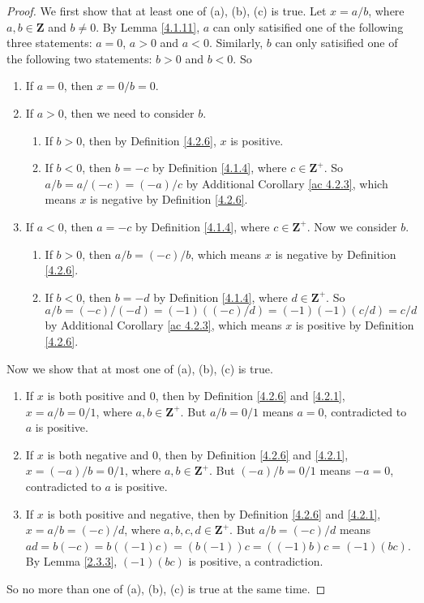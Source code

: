 \begin{proof}
We first show that at least one of (a), (b), (c) is true.
Let \(x = a / b\), where \(a, b \in \mathbf{Z}\) and \(b \neq 0\).
By Lemma \ref{4.1.11}, \(a\) can only satisified one of the following three statements:
\(a = 0\), \(a > 0\) and \(a < 0\).
Similarly, \(b\) can only satisified one of the following two statements:
\(b > 0\) and \(b < 0\).
So
\begin{enumerate}[label=(\Roman*)]
    \item If \(a = 0\), then \(x = 0 / b = 0\).
    \item If \(a > 0\), then we need to consider \(b\).
    \begin{enumerate}[label=(\roman*)]
        \item If \(b > 0\), then by Definition \ref{4.2.6}, \(x\) is positive.
        \item If \(b < 0\), then \(b = -c\) by Definition \ref{4.1.4}, where \(c \in \mathbf{Z}^+\).
        So \(a / b = a / (-c) = (-a) / c\) by Additional Corollary \ref{ac 4.2.3}, which means \(x\) is negative by Definition \ref{4.2.6}.
    \end{enumerate}
    \item If \(a < 0\), then \(a = -c\) by Definition \ref{4.1.4}, where \(c \in \mathbf{Z}^+\).
    Now we consider \(b\).
    \begin{enumerate}[label=(\roman*)]
        \item If \(b > 0\), then \(a / b = (-c) / b\), which means \(x\) is negative by Definition \ref{4.2.6}.
        \item If \(b < 0\), then \(b = -d\) by Definition \ref{4.1.4}, where \(d \in \mathbf{Z}^+\).
        So \(a / b = (-c) / (-d) = (-1)((-c) / d) = (-1)(-1)(c / d) = c / d\) by Additional Corollary \ref{ac 4.2.3}, which means \(x\) is positive by Definition \ref{4.2.6}.
    \end{enumerate}
\end{enumerate}

Now we show that at most one of (a), (b), (c) is true.
\begin{enumerate}[label=(\Roman*)]
    \item If \(x\) is both positive and \(0\), then by Definition \ref{4.2.6} and \ref{4.2.1}, \(x = a / b = 0 / 1\), where \(a, b \in \mathbf{Z}^+\).
    But \(a / b = 0 / 1\) means \(a = 0\), contradicted to \(a\) is positive.
    \item If \(x\) is both negative and \(0\), then by Definition \ref{4.2.6} and \ref{4.2.1}, \(x = (-a) / b = 0 / 1\), where \(a, b \in \mathbf{Z}^+\).
    But \((-a) / b = 0 / 1\) means \(-a = 0\), contradicted to \(a\) is positive.
    \item If \(x\) is both positive and negative, then by Definition \ref{4.2.6} and \ref{4.2.1}, \(x = a / b = (-c) / d\), where \(a, b, c, d \in \mathbf{Z}^+\).
    But \(a / b = (-c) / d\) means \(ad = b(-c) = b((-1)c) = (b(-1))c = ((-1)b)c = (-1)(bc)\).
    By Lemma \ref{2.3.3}, \((-1)(bc)\) is positive, a contradiction.
\end{enumerate}
So no more than one of (a), (b), (c) is true at the same time.
\end{proof}

